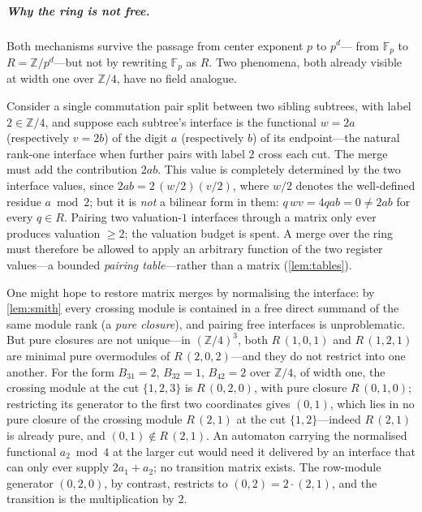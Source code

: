 \documentclass[a4paper,UKenglish,autoref,anonymous]{lipics-v2021}
\newcommand{\Fp}{\mathbb{F}_p}
\newcommand{\ZZ}{\mathbb{Z}}
\newcommand{\R}{R}                                   %
\begin{document}
\subparagraph*{Why the ring is not free.}
Both mechanisms survive the passage from center exponent $p$ to $p^d$---
from $\Fp$ to $\R = \ZZ/p^d$---but not by rewriting $\Fp$ as $\R$. Two
phenomena, both already visible at width one over $\ZZ/4$, have no field
analogue.

\begin{example}[merges are not matrices over $\ZZ/4$]
\label{ex:ringfail}
Consider a single commutation pair split between two sibling subtrees,
with label $2 \in \ZZ/4$, and suppose each subtree's interface is the
functional $w = 2a$ (respectively $v = 2b$) of the digit $a$
(respectively $b$) of its endpoint---the natural rank-one interface when
further pairs with label $2$ cross each cut. The merge must add the
contribution $2ab$. This value is completely determined by the two
interface values, since $2ab = 2\,(w/2)(v/2)$, where $w/2$ denotes the
well-defined residue $a \bmod 2$; but it is \emph{not} a bilinear form
in them: $q\,wv = 4qab = 0 \ne 2ab$ for every $q \in \R$. Pairing two
valuation-$1$ interfaces through a matrix only ever produces valuation
$\ge 2$; the valuation budget is spent. A merge over the ring must
therefore be allowed to apply an arbitrary function of the two register
values---a bounded \emph{pairing table}---rather than a matrix
(\autoref{lem:tables}).
\end{example}

\begin{example}
\label{ex:nonesting}
One might hope to restore matrix merges by normalising the interface: by
\autoref{lem:smith} every crossing module is contained in a free direct
summand of the same module rank (a \emph{pure closure}), and pairing
free interfaces is unproblematic. But pure closures are not unique---in
$(\ZZ/4)^3$, both $\R\,(1,0,1)$ and $\R\,(1,2,1)$ are minimal pure
overmodules of $\R\,(2,0,2)$---and they do not restrict into one
another. For the form $B_{31} = 2$, $B_{32} = 1$, $B_{42} = 2$ over
$\ZZ/4$, of width one, the crossing module at the cut $\{1,2,3\}$ is
$\R\,(0,2,0)$, with pure closure $\R\,(0,1,0)$; restricting its
generator to the first two coordinates gives $(0,1)$, which lies in no
pure closure of the crossing module $\R\,(2,1)$ at the cut
$\{1,2\}$---indeed $\R\,(2,1)$ is already pure, and $(0,1) \notin
\R\,(2,1)$. An automaton carrying the normalised functional $a_2 \bmod
4$ at the larger cut would need it delivered by an interface that can
only ever supply $2a_1 + a_2$; no transition matrix exists. The
row-module generator $(0,2,0)$, by contrast, restricts to $(0,2) = 2
\cdot (2,1)$, and the transition is the multiplication by $2$.
\end{example}
\end{document}
